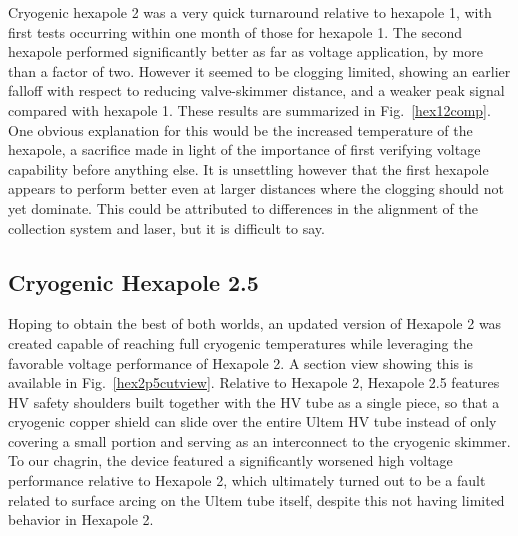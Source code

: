 Cryogenic hexapole 2 was a very quick turnaround relative to hexapole 1, with first tests occurring within one month of those for hexapole 1.
The second hexapole performed significantly better as far as voltage application, by more than a factor of two.
However it seemed to be clogging limited, showing an earlier falloff with respect to reducing valve-skimmer distance, and a weaker peak signal compared with hexapole 1.
These results are summarized in Fig.~\ref{hex12comp}.
One obvious explanation for this would be the increased temperature of the hexapole, a sacrifice made in light of the importance of first verifying voltage capability before anything else.
It is unsettling however that the first hexapole appears to perform better even at larger distances where the clogging should not yet dominate.
This could be attributed to differences in the alignment of the collection system and laser, but it is difficult to say.


\subsection{Cryogenic Hexapole 2.5}

Hoping to obtain the best of both worlds, an updated version of Hexapole 2 was created capable of reaching full cryogenic temperatures while leveraging the favorable voltage performance of Hexapole 2.
A section view showing this is available in Fig.~\ref{hex2p5cutview}.
Relative to Hexapole 2, Hexapole 2.5 features HV safety shoulders built together with the HV tube as a single piece, so that a cryogenic copper shield can slide over the entire Ultem HV tube instead of only covering a small portion and serving as an interconnect to the cryogenic skimmer.
To our chagrin, the device featured a significantly worsened high voltage performance relative to Hexapole 2, which ultimately turned out to be a fault related to surface arcing on the Ultem tube itself, despite this not having limited behavior in Hexapole 2.


